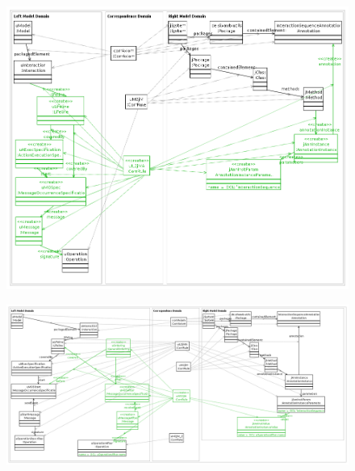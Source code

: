 \documentclass[tuberlin,cic,tc,english,noabntcite]{iiufrgs}
\begin{document}
\begin{figure}[h]
    \caption{}
    \begin{center}
        \includegraphics[width=40em]{uILifeline2jMAnnotation}
    \end{center}
    \label{fig:uILifeline2jMAnnotation}
\end{figure}
\begin{figure}[h]
    \caption{}
    \begin{center}
        \includegraphics[width=40em]{uMessageSequence2jInteractionAnnotation}
    \end{center}
    \label{fig:uMessageSequence2jInteractionAnnotation}
\end{figure}
\end{document}
